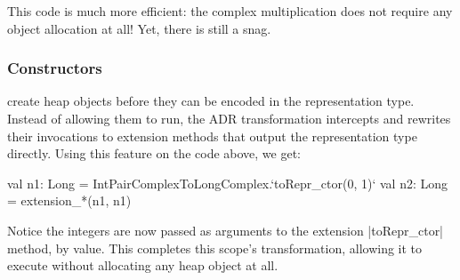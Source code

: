 This code is much more efficient: the complex multiplication does not require any object allocation at all! Yet, there is still a snag.

\subsubsection{Constructors} create heap objects before they can be encoded in the representation type. Instead of allowing them to run, the ADR transformation intercepts and rewrites their invocations to extension methods that output the representation type directly. Using this feature on the code above, we get:

\begin{lstlisting-nobreak}
val n1: Long = IntPairComplexToLongComplex.`toRepr_ctor(0, 1)`
val n2: Long = extension_*(n1, n1)
\end{lstlisting-nobreak}

Notice the integers are now passed as arguments to the extension |toRepr_ctor| method, by value. This completes this scope's transformation, allowing it to execute without allocating any heap object at all.



